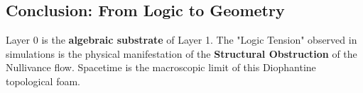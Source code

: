 \subsection{Conclusion: From Logic to Geometry}
Layer 0 is the \textbf{algebraic substrate} of Layer 1. The "Logic Tension" observed in simulations is the physical manifestation of the \textbf{Structural Obstruction} of the Nullivance flow. Spacetime is the macroscopic limit of this Diophantine topological foam.
